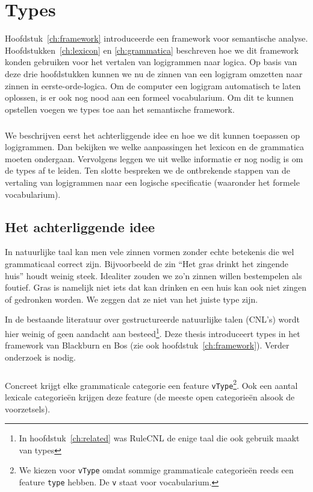 \chapter{Types}
\label{ch:types}

Hoofdstuk~\ref{ch:framework} introduceerde een framework voor semantische analyse. Hoofdstukken~\ref{ch:lexicon} en \ref{ch:grammatica} beschreven hoe we dit framework konden gebruiken voor het vertalen van logigrammen naar logica. Op basis van deze drie hoofdstukken kunnen we nu de zinnen van een logigram omzetten naar zinnen in eerste-orde-logica. Om de computer een logigram automatisch te laten oplossen, is er ook nog nood aan een formeel vocabularium. Om dit te kunnen opstellen voegen we types toe aan het semantische framework.

\paragraph{} We beschrijven eerst het achterliggende idee en hoe we dit kunnen toepassen op logigrammen. Dan bekijken we welke aanpassingen het lexicon en de grammatica moeten ondergaan. Vervolgens leggen we uit welke informatie er nog nodig is om de types af te leiden. Ten slotte bespreken we de ontbrekende stappen van de vertaling van logigrammen naar een logische specificatie (waaronder het formele vocabularium).

\section{Het achterliggende idee}
In natuurlijke taal kan men vele zinnen vormen zonder echte betekenis die wel grammaticaal correct zijn. Bijvoorbeeld de zin ``Het gras drinkt het zingende huis'' houdt weinig steek. Idealiter zouden we zo'n zinnen willen bestempelen als foutief. Gras is namelijk niet iets dat kan drinken en een huis kan ook niet zingen of gedronken worden. We zeggen dat ze niet van het juiste type zijn.

In de bestaande literatuur over gestructureerde natuurlijke talen (CNL's) wordt hier weinig of geen aandacht aan besteed\footnote{In hoofdstuk~\ref{ch:related} was RuleCNL de enige taal die ook gebruik maakt van types}. Deze thesis introduceert types in het framework van Blackburn en Bos \cite{Blackburn2005, Blackburn2006} (zie ook hoofdstuk~\ref{ch:framework}). Verder onderzoek is nodig. 

\paragraph{} Concreet krijgt elke grammaticale categorie een feature \texttt{vType}\footnote{We kiezen voor \texttt{vType} omdat sommige grammaticale categorieën reeds een feature \texttt{type} hebben. De \texttt{v} staat voor vocabularium.}. Ook een aantal lexicale categorieën krijgen deze feature (de meeste open categorieën alsook de voorzetsels).

